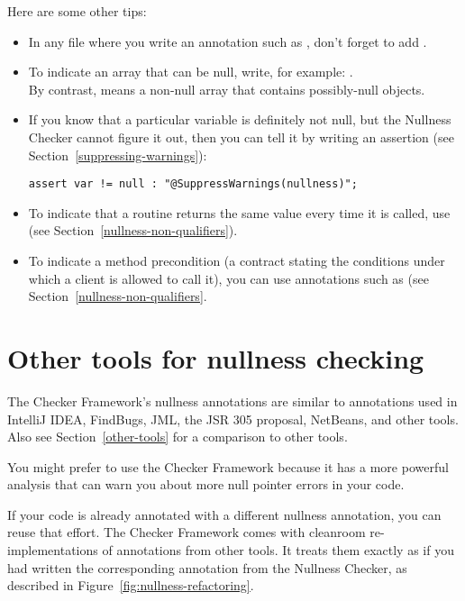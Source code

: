 Here are some other tips:
\begin{itemize}
\item
    In any file where you write an annotation such as ,
    don't forget to add .
\item
    To indicate an array that can be null, write, for example: . \\
    By contrast,  means a non-null array that
    contains possibly-null objects.
\item
    If you know that a particular variable is definitely not null, but the
    Nullness Checker cannot figure it out, then you can tell it by writing
    an assertion (see Section~\ref{suppressing-warnings}):
\begin{Verbatim}
assert var != null : "@SuppressWarnings(nullness)";
\end{Verbatim}
\item
    To indicate that a routine returns the same value every time it is
    called, use  (see Section~\ref{nullness-non-qualifiers}).
\item
    To indicate a method precondition (a contract stating the conditions
    under which a client is allowed to call it), you can use annotations
    such as  (see Section~\ref{nullness-non-qualifiers}.
\end{itemize}



\section{Other tools for nullness checking\label{nullness-related-work}}

\newcommand{\linktoNonNull}{\code{\refclass{nullness/quals}{NonNull}}}
\newcommand{\linktoNullable}{\code{\refclass{nullness/quals}{Nullable}}}

The Checker Framework's nullness annotations are similar to annotations used
in IntelliJ IDEA, FindBugs, JML, the JSR 305 proposal, NetBeans, and other tools.  Also
see Section~\ref{other-tools} for a comparison to other tools.

You might prefer to use the Checker Framework because it has a more
powerful analysis that can warn you about more null pointer errors in your
code.

If your code is already annotated with a different nullness
annotation, you can reuse that effort.  The Checker Framework comes with
cleanroom re-implementations of annotations from other tools.  It treats
them exactly as if you had written the corresponding annotation from the
Nullness Checker, as described in Figure~\ref{fig:nullness-refactoring}.


